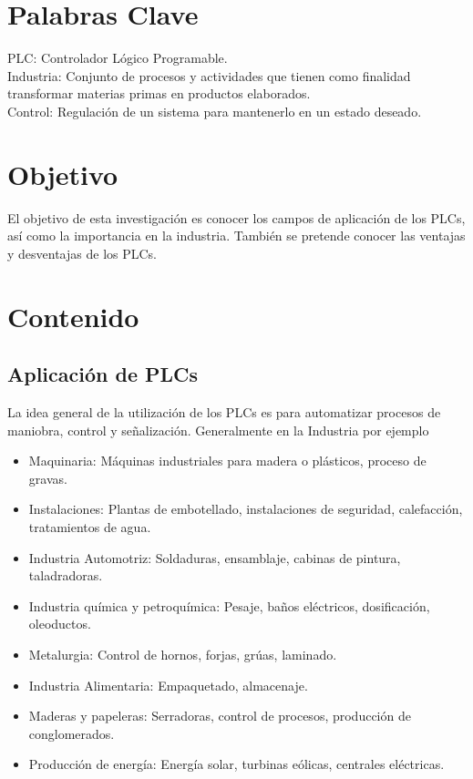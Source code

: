 \documentclass[12pt]{report}
\begin{document}
\chapter*{Palabras Clave}
PLC: Controlador Lógico Programable.\\
Industria: Conjunto de procesos y actividades que tienen como finalidad transformar materias primas en productos elaborados.\\
Control: Regulación de un sistema para mantenerlo en un estado deseado.\\
\newpage


\chapter*{Objetivo}
El objetivo de esta investigación es conocer los campos de aplicación de los PLCs, así como la importancia en la industria. También se pretende conocer las ventajas y desventajas de los PLCs.

\chapter{Contenido}
\section{Aplicación de PLCs}
La idea general de la utilización de los PLCs es para automatizar procesos de maniobra, control y señalización. Generalmente en la Industria por ejemplo
\begin{itemize}
\item Maquinaria: Máquinas industriales para madera o plásticos, proceso de gravas.
\item Instalaciones: Plantas de embotellado, instalaciones de seguridad, calefacción, tratamientos de agua.
\item Industria Automotriz: Soldaduras, ensamblaje, cabinas de pintura, taladradoras.
\item Industria química y petroquímica: Pesaje, baños eléctricos, dosificación, oleoductos.
\item Metalurgia: Control de hornos, forjas, grúas, laminado.
\item Industria Alimentaria: Empaquetado, almacenaje.
\item Maderas y papeleras: Serradoras, control de procesos, producción de conglomerados.
\item Producción de energía: Energía solar, turbinas eólicas, centrales eléctricas. \cite{Autycom2019}
\end{itemize}
\end{document}
